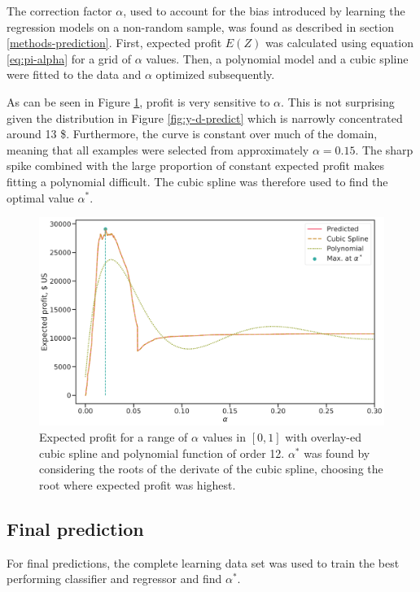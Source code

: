 \documentclass[
  11pt,
  a4paper,
  DIV=12,captions=tableheading,oneside,titlepage=firstiscover,abstracton]{scrreprt}
\begin{document}
The correction factor \(\alpha\), used to account for the bias introduced by learning the regression models on a non-random sample, was found as described in section \ref{methods-prediction}. First, expected profit \(E(Z)\) was calculated using equation \eqref{eq:pi-alpha} for a grid of \(\alpha\) values. Then, a polynomial model and a cubic spline were fitted to the data and \(\alpha\) optimized subsequently.

As can be seen in Figure \ref{fig:alpha-grid}, profit is very sensitive to \(\alpha\). This is not surprising given the distribution in Figure \ref{fig:y-d-predict} which is narrowly concentrated around 13 \$. Furthermore, the curve is constant over much of the domain, meaning that all examples were selected from approximately \(\alpha=0.15\). The sharp spike combined with the large proportion of constant expected profit makes fitting a polynomial difficult. The cubic spline was therefore used to find the optimal value \(\alpha^*\).



\begin{figure}

{\centering \includegraphics[width=0.6\linewidth]{figures/predictions/comparison-alpha-profit-models} 

}

\caption{Expected profit for a range of \(\alpha\) values in \([0,1]\) with overlay-ed cubic spline and polynomial function of order 12. \(\alpha^*\) was found by considering the roots of the derivate of the cubic spline, choosing the root where expected profit was highest.}\label{fig:alpha-grid}
\end{figure}

\hypertarget{final-prediction}{%
\subsection{Final prediction}\label{final-prediction}}

For final predictions, the complete learning data set was used to train the best performing classifier and regressor and find \(\alpha^*\).
\end{document}
